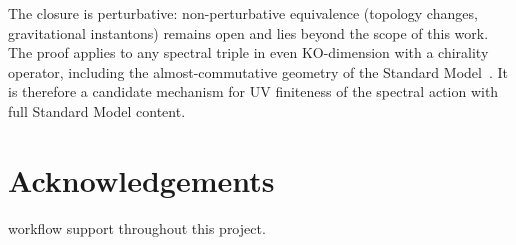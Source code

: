 \documentclass[12pt,a4paper]{article}
\theoremstyle{definition}
\theoremstyle{remark}
\begin{document}
The closure is perturbative: non-perturbative equivalence (topology changes,
gravitational instantons) remains open and lies beyond the scope of this work.
The proof applies to any spectral triple in even KO-dimension with a
chirality operator, including the almost-commutative geometry of the Standard
Model~\cite{Chamseddine:2010ud, vanSuijlekom:2014pya}.  It is therefore a
candidate mechanism for UV finiteness of the spectral action with full
Standard Model content.

\section*{Acknowledgements}

workflow support throughout this project.



\end{document}
